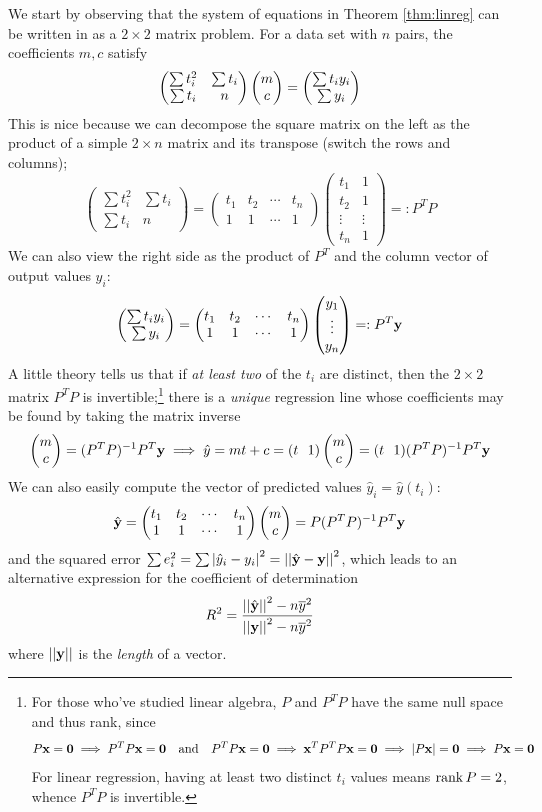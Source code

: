 We start by observing that the system of equations in Theorem \ref{thm:linreg} can be written in as a $2\times 2$ matrix problem. For a data set with $n$ pairs, the coefficients $m,c$ satisfy
\[\begin{pmatrix}
\sum t_i^2&\sum t_i\\
\sum t_i&n
\end{pmatrix}\begin{pmatrix}m\\c\end{pmatrix}=\begin{pmatrix}\sum t_iy_i\\\sum y_i\end{pmatrix}\]
This is nice because we can decompose the square matrix on the left as the product of a simple $2\times n$ matrix and its transpose (switch the rows and columns);
\[\begin{pmatrix}
\sum t_i^2&\sum t_i\\
\sum t_i&n
\end{pmatrix}
=
\begin{pmatrix}
t_1&t_2&\cdots&t_n\\
1&1&\cdots&1
\end{pmatrix}\begin{pmatrix}
t_1&1\\
t_2&1\\
\vdots&\vdots\\
t_n&1
\end{pmatrix} =:P^TP\]
We can also view the right side as the product of $P^T$ and the column vector of output values $y_i$:
\[\begin{pmatrix}\sum t_iy_i\\\sum y_i\end{pmatrix}=\begin{pmatrix}
t_1&t_2&\cdots&t_n\\
1&1&\cdots&1
\end{pmatrix}\begin{pmatrix}y_1\\\vdots\\y_n\end{pmatrix}=:P^T{\mathbf{y}}
\]
A little theory tells us that if \emph{at least two} of the $t_i$ are distinct, then the $2\times 2$ matrix $P^TP$ is invertible;\footnote{For those who've studied linear algebra, $P$ and $P^TP$ have the same null space and thus rank, since
\begin{gather*}
P{\mathbf{x}}=\mathbf{0}\implies P^TP{\mathbf{x}}=\mathbf{0}\quad\text{and}\quad P^TP{\mathbf{x}}=\mathbf{0}\implies {\mathbf{x}}^TP^TP{\mathbf{x}}=\mathbf{0}\implies \left| P{\mathbf{x}}\right|=\mathbf{0}\implies P{\mathbf{x}}=\mathbf{0}
\end{gather*}
For linear regression, having at least two distinct $t_i$ values means $\operatorname{rank} P=2$, whence $P^TP$ is invertible.} there is a \emph{unique} regression line whose coefficients may be found by taking the matrix inverse
\[\twovec mc=(P^TP)^{-1}P^T\vy \implies \hat y=mt+c=(t\ \ 1)\twovec mc=(t\ \ 1)(P^TP)^{-1}P^T\vy\]
We can also easily compute the vector of predicted values $\hat y_i=\hat y(t_i)$:
\[\hat{{\mathbf{y}}}=\begin{pmatrix}
t_1&t_2&\cdots&t_n\\
1&1&\cdots&1
\end{pmatrix}\begin{pmatrix}m\\c\end{pmatrix}=P(P^TP)^{-1}P^T{\mathbf{y}}\]
and the squared error $\sum e_i^2=\sum\left| \hat y_i-y_i\right|^2=\left| \left| \hat{{\mathbf{y}}}-{\mathbf{y}}\right|\right|^2$, which leads to an alternative expression for the coefficient of determination
\[R^2=\frac{\left| \left| \hat{{\mathbf{y}}}\right|\right|^2-n\overline{y}^2}{\left| \left| {\mathbf{y}}\right|\right|^2-n\overline{y}^2}\]
where $\left| \left| {\mathbf{y}}\right|\right|$ is the \emph{length} of a vector.

